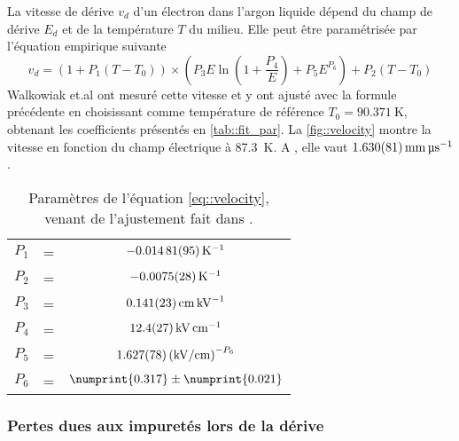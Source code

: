         La vitesse de dérive $v_d$ d'un électron dans l'argon liquide dépend du champ de dérive $E_d$ et de la température $T$ du milieu. Elle peut être paramétrisée par l'équation empirique suivante\cite{Gonidec1996}
        \begin{equation}\label{eq::velocity}
          v_d = \left(1+P_1(T-T_0)\right)\times\left(P_3E\ln\left(1+\frac{P_4}{E}\right)+P_5E^{P_6}\right) + P_2(T-T_0)
        \end{equation}
        Walkowiak et.al\cite{Walkowiak2000} ont mesuré cette vitesse et y ont ajusté avec la formule précédente en choisissant comme température de référence $T_0=\SI{90.371}{\kelvin}$, obtenant les coefficients présentés en \autoref{tab::fit_par}. La \autoref{fig::velocity} montre la vitesse en fonction du champ électrique à \SI{87.3}{\kelvin}. A \driftfield{}, elle vaut $\SI{1.63\pm0.081}{\milli\meter\per\micro\second}$.
        \begin{table}[htpb]
          \centering
          \begin{tabular}{ccc}
          $P_1$ & = & $\SI{-0.01481\pm0.00095}{\per\kelvin}$ \\
          $P_2$ & = & $\SI{-0.0075\pm0.0028}{\per\kelvin}$ \\
          $P_3$ & = & $\SI{0.141\pm0.023}{\centi\meter\per\kilo\volt}$ \\
          $P_4$ & = & $\SI{12.4\pm2.7}{\kilo\volt\per\centi\meter}$ \\
          $P_5$ & = & $\SI{1.627\pm0.078}{(\kilo\volt\per\centi\meter)^{-P_6}}$ \\
          $P_6$ & = & $\numprint{0.317}\pm\numprint{0.021}$ \\
          \end{tabular}
          \caption{\label{tab::fit_par}Paramètres de l'équation \eqref{eq::velocity}, venant de l'ajustement fait dans \cite{Walkowiak2000}.}
        \end{table}

      \subsubsection{Pertes dues aux impuretés lors de la dérive}
        
